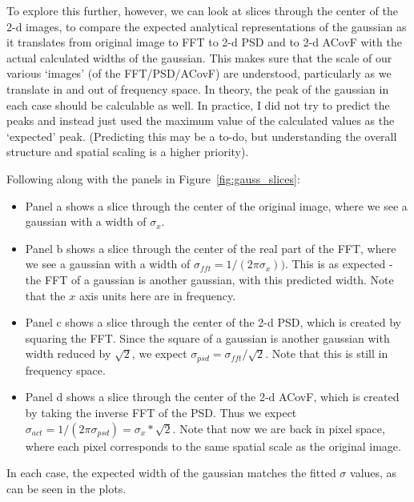\documentclass[11pt,preprint]{aastex}
\begin{document}
To explore this further, however, we can look at slices through the center of the 2-d images, to compare the expected analytical representations of the gaussian as it translates from original image to FFT to 2-d PSD and to 2-d ACovF with the actual calculated widths of the gaussian. This makes sure that the scale of our various `images' (of the FFT/PSD/ACovF) are understood, particularly as we translate in and out of frequency space. In theory, the peak of the gaussian in each case should be calculable as well. In practice, I did not try to predict the peaks and instead just used the maximum value of the calculated values as the `expected' peak. (Predicting this may be a to-do, but understanding the overall structure and spatial scaling is a higher priority). 

Following along with the panels in Figure~\ref{fig:gauss_slices}: 
\begin{itemize}
\item{Panel a shows a slice through the center of the original image, where we see a gaussian with a width of $\sigma_{x}$. }
\item{Panel b shows a slice through the center of the real part of the FFT, where we see a gaussian with a width of $\sigma_{fft} = 1 / (2 \pi \sigma_{x}))$. This is as expected - the FFT of a gaussian is another gaussian, with this predicted width. Note that the $x$ axis units here are in frequency.}
\item{Panel c shows a slice through the center of the 2-d PSD, which is created by squaring the FFT. Since the square of a gaussian is another gaussian with width reduced by $\sqrt 2$, we expect $\sigma_{psd} = \sigma_{fft} / \sqrt 2$. Note that this is still in frequency space. }
\item{Panel d shows a slice through the center of the 2-d ACovF, which is created by taking the inverse FFT of the PSD. Thus we expect $\sigma_{act} = 1 / (2 \pi \sigma_{psd}) = \sigma_{x} * \sqrt 2$. Note that now we are back in pixel space, where each pixel corresponds to the same spatial scale as the original image.}
\end{itemize}
In each case, the expected width of the gaussian matches the fitted $\sigma$ values, as can be seen in the plots. 
\end{document}
